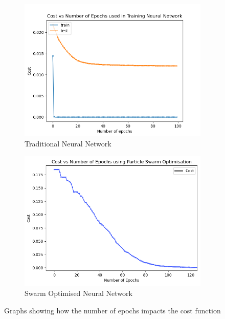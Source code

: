 \begin{itemize}
    \begin{figure}[H]
        \begin{subfigure}[h]{0.53\linewidth}
        \includegraphics[width=\linewidth]{progress2/figures/cost vs epoch NN.png}
        \caption{Traditional Neural Network}
        \end{subfigure}
        \hfill
        \begin{subfigure}[h]{0.53\linewidth}
        \includegraphics[width=\linewidth]{progress2/figures/cost vs epoch PSO.png}
        \caption{Swarm Optimised Neural Network}
        \end{subfigure}%
        \caption{Graphs showing how the number of epochs impacts the cost function}
    \end{figure}
    

\end{itemize}
